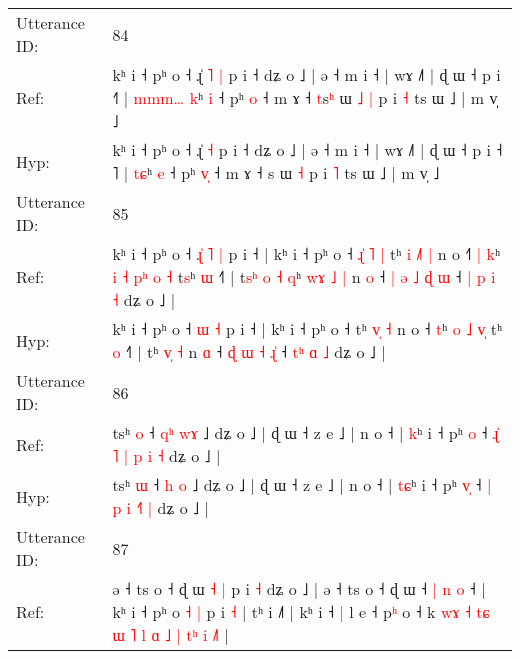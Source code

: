 \documentclass[10pt]{article}
\DeclareRobustCommand{\hl}[1]{{\textcolor{red}{#1}}}
\begin{document}
\begin{longtable}{ll}
\midrule
Utterance ID: & 84 \\
Ref: & kʰ i ˧ pʰ o ˧ ɻ̍\hl{ }\hl{˥} \hl{|} p i ˧ dʑ o ˩ | ə ˧ m i ˧ | wɤ ˩˥ | ɖ ɯ ˧ p i ˧\hl{}˥ | \hl{m}\hl{m}\hl{m}\hl{…}\hl{ }\hl{k}ʰ \hl{i} ˧ pʰ \hl{}\hl{o} ˧ m ɤ ˧ \hl{t}s\hl{ʰ} ɯ\hl{ }\hl{˩} \hl{|} p i \hl{˧} ts ɯ ˩ | m v̩ ˩
 \\
Hyp: & kʰ i ˧ pʰ o ˧ ɻ̍\hl{}\hl{} \hl{˧} p i ˧ dʑ o ˩ | ə ˧ m i ˧ | wɤ ˩˥ | ɖ ɯ ˧ p i ˧\hl{ }˥ | \hl{}\hl{}\hl{}\hl{}\hl{t}\hl{ɕ}ʰ \hl{e} ˧ pʰ \hl{v}\hl{̩} ˧ m ɤ ˧ \hl{}s\hl{} ɯ\hl{}\hl{} \hl{˧} p i \hl{˥} ts ɯ ˩ | m v̩ ˩
 \\
\midrule
Utterance ID: & 85 \\
Ref: & kʰ i ˧ pʰ o ˧\hl{ }\hl{ɻ}\hl{̍} \hl{˥} \hl{|} p i ˧ | kʰ i ˧ pʰ o ˧\hl{ }\hl{ɻ}\hl{̍}\hl{ }\hl{˥}\hl{ }\hl{|} tʰ\hl{ }\hl{i} \hl{˩}\hl{˥} \hl{|} n o ˧\hl{˥}\hl{ }\hl{|} \hl{k}ʰ\hl{ }\hl{i} \hl{˧} \hl{p}\hl{ʰ} \hl{o}\hl{ }\hl{˧} t\hl{s}ʰ \hl{ɯ} ˧˥ | t\hl{s}\hl{ʰ}\hl{ }\hl{o}\hl{ }\hl{˧}\hl{ }\hl{q}ʰ \hl{w}\hl{ɤ}\hl{ }\hl{˩} \hl{|} n \hl{o} ˧ \hl{|} \hl{ə} \hl{˩} \hl{ɖ}\hl{ }\hl{ɯ} ˧ \hl{|}\hl{ }\hl{p} \hl{i} \hl{˧} dʑ o ˩ |
 \\
Hyp: & kʰ i ˧ pʰ o ˧\hl{}\hl{}\hl{} \hl{ɯ} \hl{˧} p i ˧ | kʰ i ˧ pʰ o ˧\hl{}\hl{}\hl{}\hl{}\hl{}\hl{}\hl{} tʰ\hl{}\hl{} \hl{v}\hl{̩} \hl{˧} n o ˧\hl{}\hl{}\hl{} \hl{t}ʰ\hl{}\hl{} \hl{o} \hl{}\hl{˩} \hl{}\hl{v}\hl{̩} t\hl{}ʰ \hl{o} ˧˥ | t\hl{}\hl{}\hl{}\hl{}\hl{}\hl{}\hl{}\hl{}ʰ \hl{}\hl{}\hl{v}\hl{̩} \hl{˧} n \hl{ɑ} ˧ \hl{ɖ} \hl{ɯ} \hl{˧} \hl{}\hl{ɻ}\hl{̍} ˧ \hl{}\hl{t}\hl{ʰ} \hl{ɑ} \hl{˩} dʑ o ˩ |
 \\
\midrule
Utterance ID: & 86 \\
Ref: & tsʰ \hl{o} ˧ \hl{q}\hl{ʰ} \hl{w}\hl{ɤ} ˩ dʑ o ˩ | ɖ ɯ ˧ z e ˩ | n o ˧ | \hl{}\hl{k}ʰ i ˧ pʰ \hl{}\hl{o} ˧ \hl{ɻ}\hl{̍} \hl{˥} \hl{|} \hl{p}\hl{ }\hl{i} \hl{˧} dʑ o ˩ |
 \\
Hyp: & tsʰ \hl{ɯ} ˧ \hl{}\hl{h} \hl{}\hl{o} ˩ dʑ o ˩ | ɖ ɯ ˧ z e ˩ | n o ˧ | \hl{t}\hl{ɕ}ʰ i ˧ pʰ \hl{v}\hl{̩} ˧ \hl{}\hl{|} \hl{p} \hl{i} \hl{}\hl{˧}\hl{˥} \hl{|} dʑ o ˩ |
 \\
\midrule
Utterance ID: & 87 \\
Ref: & ə\hl{}\hl{}\hl{} ˧ ts o ˧ ɖ ɯ\hl{}\hl{} \hl{}\hl{˧} \hl{|} p i \hl{˧} dʑ o ˩ | ə ˧ ts o ˧ ɖ ɯ ˧ \hl{|} \hl{n}\hl{ }\hl{o} ˧ | kʰ i ˧ pʰ o\hl{ }\hl{˧} \hl{|} p i \hl{˧} | tʰ i ˩˥ | kʰ i ˧\hl{ }\hl{|} l e ˧ p\hl{ʰ} o ˧ k\hl{ }\hl{w}\hl{ɤ}\hl{ }\hl{˧}\hl{ }\hl{t}\hl{ɕ}\hl{ }\hl{ɯ}\hl{ }\hl{˥}\hl{ }\hl{l}\hl{ }\hl{ɑ}\hl{ }\hl{˩}\hl{ }\hl{|} \hl{t}\hl{ʰ}\hl{ }\hl{i} \hl{˩}˥ |
 \\

\end{longtable}
\end{document}
